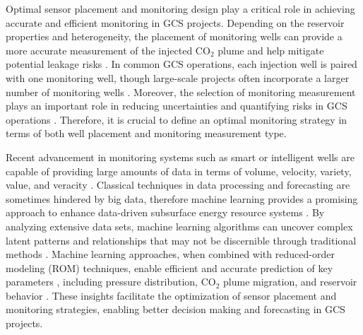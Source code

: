 \documentclass[a4paper,fleqn]{cas-sc}
\begin{document}
Optimal sensor placement and monitoring design play a critical role in achieving accurate and efficient monitoring in GCS projects. Depending on the reservoir properties and heterogeneity, the placement of monitoring wells can provide a more accurate measurement of the injected CO$_2$ plume and help mitigate potential leakage risks \citep{Sun2019, Tang2022, Ma2022, Nwachukwu2018}. In common GCS operations, each injection well is paired with one monitoring well, though large-scale projects often incorporate a larger number of monitoring wells \citep{ButlerJr.19993553, Cardiff2012, Brauchler20132013}. Moreover, the selection of monitoring measurement plays an important role in reducing uncertainties and quantifying risks in GCS operations \citep{Chen2020, Sun2013, Seto2011845, Yang20158887, Yonkofski2016}. Therefore, it is crucial to define an optimal monitoring strategy in terms of both well placement and monitoring measurement type. 

Recent advancement in monitoring systems such as smart or intelligent wells are capable of providing large amounts of data in terms of volume, velocity, variety, value, and veracity \citep{2021AGUFM.H25O1207S, tariq2021systematic, MIRZA202227}. Classical techniques in data processing and forecasting are sometimes hindered by big data, therefore machine learning provides a promising approach to enhance data-driven subsurface energy resource systems \citep{10.30632/SPWLA-2023-0084, pan2022, Laloy2018381, Liu2019725, Etienam2019}. By analyzing extensive data sets, machine learning algorithms can uncover complex latent patterns and relationships that may not be discernible through traditional methods \citep{Hassoun1995FundamentalsNetworks, Yegnanarayana2009ArtificialNetworks, Yeten2005, Chen2016, Babaei201619, Guo20182409, Ampomah201780, Wang2009506}. Machine learning approaches, when combined with reduced-order modeling (ROM) techniques, enable efficient and accurate prediction of key parameters \citep{Brunton2016SparseNLDynamics, FriesChoi2022LaSDI, HeChoi2023gLaSDI, Lucia2004Reduced-orderPhysics, Cardoso2009DevelopmentSimulationb, Zhu201956, Jin2020}, including pressure distribution, CO$_2$ plume migration, and reservoir behavior \citep{Wen2023Operators, Wen2021, Maldonado2021Unet, Razak2022, Kim2023}. These insights facilitate the optimization of sensor placement and monitoring strategies, enabling better decision making and forecasting in GCS projects.
\end{document}
